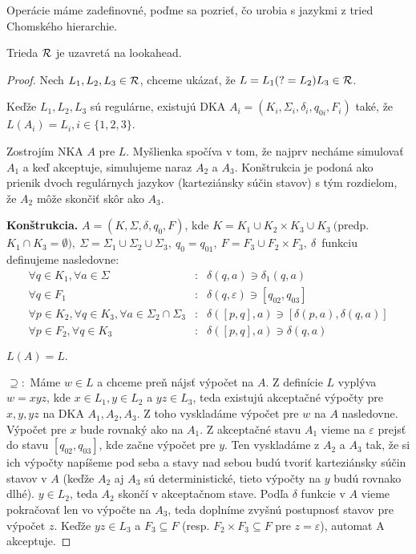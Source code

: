 Operácie máme zadefinovné, poďme sa pozrieť, čo urobia s jazykmi z tried Chomského hierarchie.

\begin{lema}
Trieda ${\cal R}$ je uzavretá na lookahead.
\end{lema}
\begin{proof}
Nech $ L_{1}, L_{2}, L_{3} \in {\cal R} $, chceme ukázať, že  $ L = L_{1}(?=L_{2})L_{3} \in {\cal R} $.

Keďže $ L_{1},L_{2},L_{3} $ sú regulárne, existujú DKA $ A_{i} = (K_{i},\Sigma_{i},\delta_{i},q_{0i},F_{i}) $ také, že $ L(A_{i})=L_{i}, i \in \lbrace 1,2,3\rbrace $. 

Zostrojím NKA $ A $ pre $L$. Myšlienka spočíva v tom, že najprv necháme simulovať $A_1$ a keď akceptuje, simulujeme naraz $A_2$ a $A_3$. Konštrukcia je podoná ako prienik dvoch regulárnych jazykov (karteziánsky súčin stavov) s tým rozdielom, že $A_2$ môže skončiť skôr ako $A_3$.

\textbf{Konštrukcia.}  $ A = (K,\Sigma,\delta,q_{0},F) $, kde
$ K = K_{1} \cup K_{2} \times K_{3} \cup K_{3} ~ ( $predp. $ K_{1} \cap K_{3}= \emptyset), ~
\Sigma=\Sigma_{1}\cup\Sigma_{2}\cup\Sigma_{3}, ~ q_{0}=q_{01}, ~ F = F_{3} \cup F_{2} \times F_{3}, ~ \delta $~funkciu definujeme nasledovne:
\begin{eqnarray*}
\forall q \in K_{1}, \forall a \in \Sigma &:& \delta(q,a) \ni \delta_{1}(q,a) \\
\forall q \in F_{1} &:& \delta(q,\varepsilon ) \ni \left[ q_{02},q_{03} \right] \\
\forall p \in K_{2}, \forall q \in K_{3}, \forall a \in \Sigma_{2} \cap \Sigma_{3} &:& \delta( \left[ p,q \right] ,a) \ni \left[ \delta(p,a), \delta (q,a) \right] \\
\forall p \in F_2, \forall q \in K_3 &:& \delta(\left[p,q\right],a) \ni \delta(q,a) 
\end{eqnarray*}

$ L(A) = L. $

$ \supseteq: $ Máme $ w \in L $ a chceme preň nájsť výpočet na $A$. Z definície $L$ vyplýva $w=xyz$, kde $x \in L_1, y \in L_2$ a $yz \in L_3$, teda existujú akceptačné výpočty pre $x,y,yz$ na DKA $A_1,A_2,A_3$. Z toho vyskladáme výpočet pre $w$ na $A$ nasledovne. Výpočet pre $x$ bude rovnaký ako na $A_1$. Z akceptačné stavu $A_1$ vieme na $\varepsilon$ prejsť do stavu $\left[q_{02},q_{03}\right]$, kde začne výpočet pre $y$. Ten vyskladáme z $A_2$ a $A_3$ tak, že si ich výpočty napíšeme pod seba a stavy nad sebou budú tvoriť karteziánsky súčin stavov v $A$ (keďže $A_2$ aj $A_3$ sú deterministické, tieto výpočty na $y$ budú rovnako dlhé). $y \in L_2$, teda $A_2$ skončí v akceptačnom stave. Podľa $\delta$ funkcie v $A$ vieme pokračovať len vo výpočte na $A_3$, teda doplníme zvyšnú postupnosť stavov pre výpočet $z$. Keďže $yz \in L_3$ a $F_3\subseteq F$ (resp. $F_2\times F_3\subseteq F$ pre $z=\varepsilon$), automat A akceptuje. 


\end{proof}
